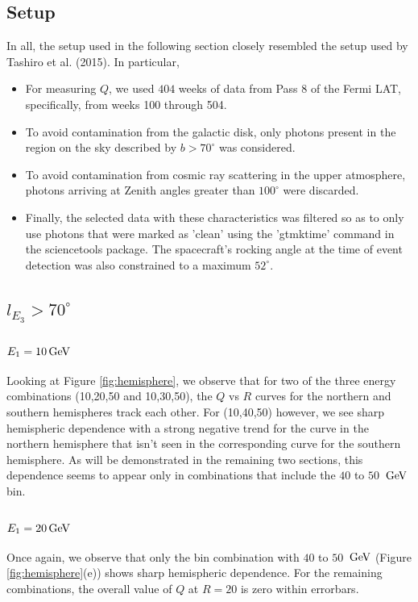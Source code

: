 \documentclass[english]{article}
\newcommand{\GeV}{\,{\rm GeV}}
\begin{document}
\subsection{Setup}
In all, the setup used in the following section closely resembled the setup
used by Tashiro et al. (2015). In particular,
\begin{itemize}
\item For measuring $Q$, we used $404$ weeks of data from Pass 8 of the Fermi 
	LAT, specifically, from weeks 100 through 504.
\item To avoid contamination from the galactic disk, only photons present in
	the region on the sky described by $b > 70^{\circ}$ was considered.
\item To avoid contamination from cosmic ray scattering in the upper
	atmosphere, photons arriving at Zenith angles greater than $100^{\circ}$ 
	were discarded.
\item Finally, the selected data with these characteristics was filtered so as
	to only use photons that were marked as 'clean' using the 'gtmktime' command
	in the sciencetools package. The spacecraft's rocking angle at the time of 
	event detection was also constrained to a maximum $52^{\circ}$.
\end{itemize}

\subsection{$l_{E_3} > 70^{\circ}$}

\subsubsection{$E_1 = 10 \GeV$}
Looking at Figure \ref{fig:hemisphere}, we observe that for two of the three
energy combinations (10,20,50 and 10,30,50), the $Q$ vs $R$ curves for the 
northern and southern hemispheres track each other. 
For (10,40,50) however, we see sharp hemispheric dependence with a strong negative
trend for the curve in the northern hemisphere that isn't seen in the 
corresponding curve for the southern hemisphere.
As will be demonstrated in the remaining two sections, this dependence seems
to appear only in combinations that include the $40$ to $50$ $\GeV$ bin.

\subsubsection{$E_1 = 20 \GeV$}
Once again, we observe that only the bin combination with $40$ to $50$ $\GeV$
(Figure \ref{fig:hemisphere}(e)) shows sharp hemispheric dependence. 
For the remaining combinations, the overall value of $Q$ at $R=20$ is zero within
errorbars.
\end{document}
